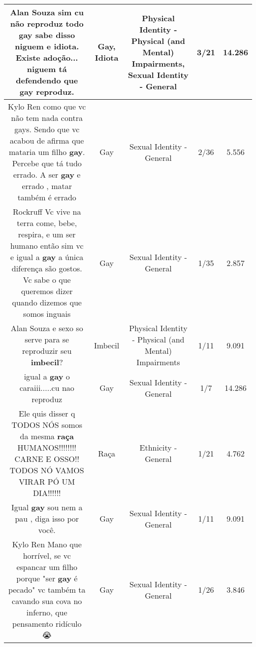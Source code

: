 \documentclass[11pt]{article}
\newlength\mylength
\begin{document}
\begin{center}
\begin{longtable}{|C{.65\mylength}|C{.30\mylength}|C{.12\mylength}|C{.12\mylength}|C{.12\mylength}|}
  \small Alan Souza sim cu não reproduz todo \textbf{gay} sabe disso niguem e \textbf{idiota}. Existe adoção... niguem tá defendendo que \textbf{gay} reproduz.\normalsize   & Gay, Idiota & Physical Identity - Physical (and Mental) Impairments, Sexual Identity - General & 3/21 & 14.286 \\  \hline
  \small Kylo Ren como que vc não tem nada contra gays. Sendo que vc acabou de afirma que mataria um filho \textbf{gay}. Percebe que tá tudo errado. A ser \textbf{gay} e errado , matar também é errado\normalsize   & Gay & Sexual Identity - General & 2/36 & 5.556 \\  \hline
  \small Rockruff Vc vive na terra come, bebe, respira, e um ser humano então sim vc e igual a  \textbf{gay} a única diferença são gostos. Vc sabe o que queremos dizer quando dizemos que somos inguais\normalsize   & Gay & Sexual Identity - General & 1/35 & 2.857 \\  \hline
  \small Alan Souza  e sexo so serve para se reproduzir seu \textbf{imbecil}?\normalsize   & Imbecil & Physical Identity - Physical (and Mental) Impairments & 1/11 & 9.091 \\  \hline
  \small igual a \textbf{gay} o caraiii.....cu nao reproduz\normalsize   & Gay & Sexual Identity - General & 1/7 & 14.286 \\  \hline
  \small Ele quis disser q TODOS NÓS somos da mesma \textbf{raça} HUMANOS!!!!!!!! CARNE E OSSO!! TODOS NÓ VAMOS VIRAR PÓ UM DIA!!!!!!\normalsize   & Raça & Ethnicity - General & 1/21 & 4.762 \\  \hline
  \small Igual \textbf{gay} sou nem a pau , diga isso por você.\normalsize   & Gay & Sexual Identity - General & 1/11 & 9.091 \\  \hline
  \small Kylo Ren Mano que horrível, se vc espancar um filho porque "ser \textbf{gay} é pecado" vc também ta cavando sua cova no inferno, que pensamento ridículo😭\normalsize   & Gay & Sexual Identity - General & 1/26 & 3.846 \\  \hline

\end{longtable}
\end{center}
\end{document}
